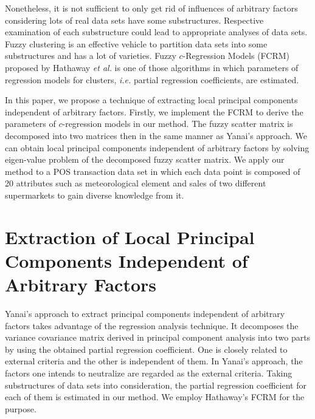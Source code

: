 \documentclass{article}
\begin{document}
Nonetheless, it is not sufficient to only get rid of influences of arbitrary factors considering lots of real data sets have some substructures. Respective examination of each substructure could lead to appropriate analyses of data sets. Fuzzy clustering is an effective vehicle to partition data sets into some substructures and has a lot of varieties. Fuzzy $c$-Regression Models (FCRM) \cite{Hathaway} proposed by Hathaway {\it et al.} is one of those algorithms in which parameters of regression models for clusters, {\it i.e.} partial regression coefficients, are estimated. 

In this paper, we propose a technique of extracting local principal components independent of arbitrary factors. Firstly, we implement the FCRM to derive the parameters of $c$-regression models in our method. The fuzzy scatter matrix is decomposed into two matrices then in the same manner as Yanai's approach. We can obtain local principal components independent of arbitrary factors by solving eigen-value problem of the decomposed fuzzy scatter matrix. We apply our method to a POS transaction data set in which each data point is composed of 20 attributes such as meteorological element and sales of two different supermarkets to gain diverse knowledge from it. 


\section{Extraction of Local Principal Components Independent of Arbitrary \mbox{Factors}}

Yanai's approach \cite{Yanai} to extract principal components independent of arbitrary factors takes advantage of the regression analysis technique. It decomposes the variance covariance matrix derived in principal component analysis into two parts by using the obtained partial regression coefficient. One is closely related to external criteria and the other is independent of them. In Yanai's approach, the factors one intends to neutralize are regarded as the external criteria. Taking substructures of data sets into consideration, the partial regression coefficient for each of them is estimated in our method. We employ Hathaway's FCRM \cite{Hathaway} for the purpose.
\end{document}
